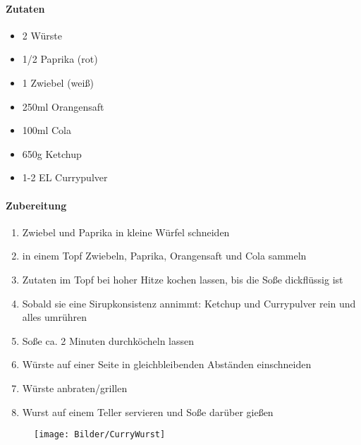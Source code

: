 \paragraph{Zutaten}
\begin{itemize}[noitemsep]
	\item 2 Würste
	\item 1/2 Paprika (rot)
	\item 1 Zwiebel (weiß)
	\item 250ml Orangensaft
	\item 100ml Cola
	\item 650g Ketchup
	\item 1-2 EL Currypulver
\end{itemize}
\paragraph{Zubereitung}
\begin{enumerate}[noitemsep]
	\item Zwiebel und Paprika in kleine Würfel schneiden
	\item in einem Topf Zwiebeln, Paprika, Orangensaft und Cola sammeln 
	\item Zutaten im Topf bei hoher Hitze kochen lassen, bis die Soße dickflüssig ist
	\item Sobald sie eine Sirupkonsistenz annimmt: Ketchup und Currypulver rein und alles umrühren 
	\item Soße ca. 2 Minuten durchköcheln lassen
	\item Würste auf einer Seite in gleichbleibenden Abständen einschneiden
	\item Würste anbraten/grillen 
	\item Wurst auf einem Teller servieren und Soße darüber gießen
\end{enumerate}
\begin{figure}[h]
\centering
\texttt{[image: Bilder/CurryWurst]}
\end{figure}
